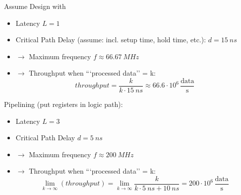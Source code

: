 \documentclass{article}
\begin{document}
Assume Design with
\begin{itemize}
    \item Latency $L = 1$
    \item Critical Path Delay (assume: incl. setup time, hold time, etc.): $d = \SI{15}{ns}$
    \item $\rightarrow$ Maximum frequency $f \approx \SI{66.67}{MHz}$
    \item $\rightarrow$ Throughput when ```processed data'' = k:
          \[
              throughput = \frac{k}{k \cdot \SI{15}{ns}} \approx 66.6 \cdot 10^6 \, \frac{\text{data}}{\text{s}}
          \]
\end{itemize}

Pipelining (put registers in logic path):
\begin{itemize}
    \item Latency $L = 3$
    \item Critical Path Delay $d = \SI{5}{ns}$
    \item $\rightarrow$ Maximum frequency $f \approx \SI{200}{MHz}$
    \item $\rightarrow$ Throughput when ```processed data'' = k:
          \[
              \lim_{k \to \infty} (throughput) = \lim_{k \to \infty} \frac{k}{k \cdot \SI{5}{ns} + \SI{10}{ns}} = 200 \cdot 10^6 \, \frac{\text{data}}{\text{s}}
          \]
\end{itemize}
\end{document}
